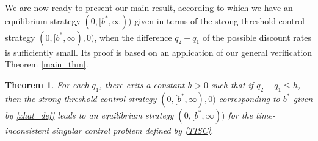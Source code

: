 \documentclass[11pt]{article} %
\newtheorem{theorem}{Theorem}[section]
\numberwithin{komcounter}{section}
\begin{document}
We are now ready to present our main result, according to which we have an equilibrium strategy $(0,[b^*,\infty))$ given in terms of the strong threshold control strategy $(0,[b^*,\infty),0)$, when the difference $q_2-q_1$ of the possible discount rates is sufficiently small. 
Its proof is based on an application of our general verification Theorem \ref{main_thm}. 

\begin{theorem}\label{prop_pure_ex} 
For each $q_1$, there exits a constant $h>0$ such that if 
$q_2-q_1\leq h$, then the strong threshold control strategy $(0,[b^*,\infty),0)$ corresponding to $b^*$ given by \eqref{xhat_def} leads to an equilibrium strategy $(0,[b^*,\infty))$ for the time-inconsistent singular control problem defined by \eqref{TISC}.
\end{theorem}
\end{document}
